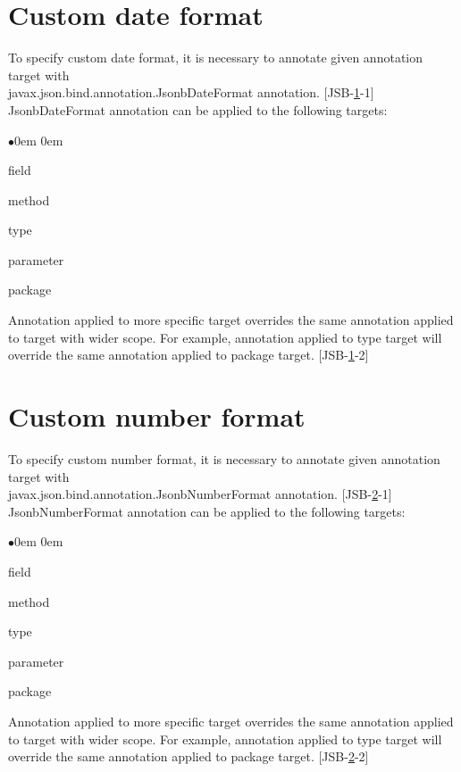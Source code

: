 \section{Custom date format}
\label{sec:custom_date_format}

To specify custom date format, it is necessary to annotate given annotation target with \\ javax.json.bind.annotation.JsonbDateFormat annotation. [JSB-\ref{sec:custom_date_format}-1] JsonbDateFormat annotation can be applied to the following targets:

\begin{list}{$\bullet$}{\parsep 0em  0em}
\item field
\item method
\item type
\item parameter
\item package
\end{list}

Annotation applied to more specific target overrides the same annotation applied to target with wider scope. For example, annotation applied to type target will override the same annotation applied to package target. [JSB-\ref{sec:custom_date_format}-2]

\section{Custom number format}
\label{sec:custom_number_format}

To specify custom number format, it is necessary to annotate given annotation target with \\ javax.json.bind.annotation.JsonbNumberFormat annotation. [JSB-\ref{sec:custom_number_format}-1] JsonbNumberFormat annotation can be applied to the following targets:

\begin{list}{$\bullet$}{\parsep 0em  0em}
\item field
\item method
\item type
\item parameter
\item package
\end{list}

Annotation applied to more specific target overrides the same annotation applied to target with wider scope. For example, annotation applied to type target will override the same annotation applied to package target. [JSB-\ref{sec:custom_number_format}-2]

